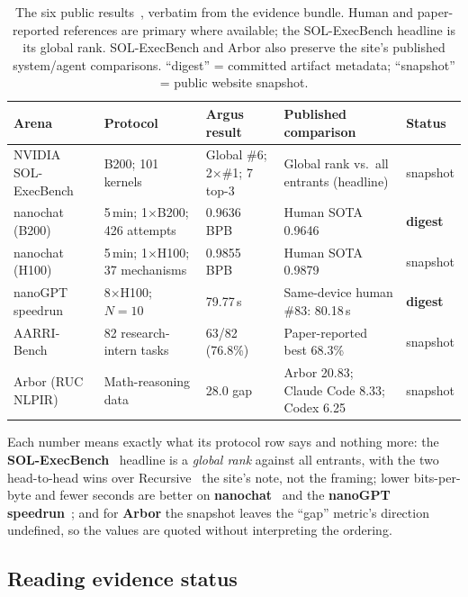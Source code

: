 \begin{table}[H]
\centering
\small
\begin{tabularx}{\linewidth}{@{}p{2.5cm} p{2.7cm} p{2.15cm} X p{1.55cm}@{}}
\toprule
\textbf{Arena} & \textbf{Protocol} & \textbf{Argus result} & \textbf{Published comparison} & \textbf{Status} \\
\midrule
NVIDIA SOL-ExecBench & B200; 101 kernels & Global \#6; 2$\times$\#1; 7 top-3 & Global rank vs.\ all entrants (headline) & snapshot \\
nanochat (B200) & 5\,min; 1$\times$B200; 426 attempts & 0.9636 BPB & Human SOTA 0.9646 & \textbf{digest} \\
nanochat (H100) & 5\,min; 1$\times$H100; 37 mechanisms & 0.9855 BPB & Human SOTA 0.9879 & snapshot \\
nanoGPT speedrun & 8$\times$H100; $N{=}10$ & 79.77\,s & Same-device human \#83: 80.18\,s & \textbf{digest} \\
AARRI-Bench & 82 research-intern tasks & 63/82 (76.8\%) & Paper-reported best 68.3\% & snapshot \\
Arbor (RUC NLPIR) & Math-reasoning data & 28.0 gap & Arbor 20.83; Claude Code 8.33; Codex 6.25 & snapshot \\
\bottomrule
\end{tabularx}
\caption{The six public results~\cite{argus_results}, verbatim from the evidence
bundle. Human and paper-reported references are primary where available; the
SOL-ExecBench headline is its global rank. SOL-ExecBench and Arbor also preserve
the site's published system/agent comparisons. ``digest'' = committed artifact
metadata; ``snapshot'' = public website snapshot.}
\label{tab:results}
\end{table}

Each number means exactly what its protocol row says and nothing more: the
\textbf{SOL-ExecBench}~\cite{ouyang2025kernelbench} headline is a \emph{global rank}
against all entrants, with the two head-to-head wins over
Recursive~\cite{recursive2026firststeps} the site's note, not the framing; lower
bits-per-byte and fewer seconds are better on
\textbf{nanochat}~\cite{karpathy_nanochat} and the \textbf{nanoGPT
speedrun}~\cite{karpathy_nanogpt}; and for \textbf{Arbor} the snapshot leaves the
``gap'' metric's direction undefined, so the values are quoted without interpreting
the ordering.

\subsection{Reading evidence status}

